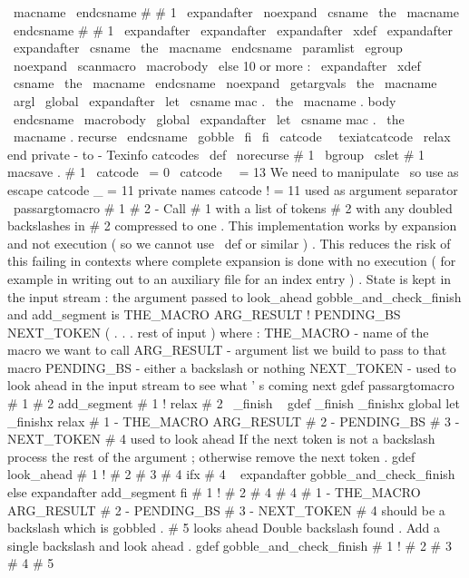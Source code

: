 {{{{\
macname
\
endcsname
#
#
1
{
%
\
expandafter
\
noexpand
\
csname
\
the
\
macname
\
endcsname
#
#
1
}
%
\
expandafter
\
expandafter
\
expandafter
\
xdef
\
expandafter
\
expandafter
\
csname
\
the
\
macname
\
endcsname
\
paramlist
{
%
\
egroup
\
noexpand
\
scanmacro
{
\
macrobody
}
}
%
\
else
%
10
or
more
:
\
expandafter
\
xdef
\
csname
\
the
\
macname
\
endcsname
{
%
\
noexpand
\
getargvals
{
\
the
\
macname
}
{
\
argl
}
%
}
%
\
global
\
expandafter
\
let
\
csname
mac
.
\
the
\
macname
.
body
\
endcsname
\
macrobody
\
global
\
expandafter
\
let
\
csname
mac
.
\
the
\
macname
.
recurse
\
endcsname
\
gobble
\
fi
\
fi
}
\
catcode
\
\
texiatcatcode
\
relax
%
end
private
-
to
-
Texinfo
catcodes
\
def
\
norecurse
#
1
{
\
bgroup
\
cslet
{
#
1
}
{
macsave
.
#
1
}
}
%
%
%
%
%
%
%
%
%
%
%
%
%
%
%
%
%
%
%
%
%
%
%
%
%
%
%
%
%
%
%
%
%
%
%
%
%
%
%
%
%
%
%
%
%
%
%
%
{
\
catcode
\
=
0
\
catcode
\
\
=
13
%
We
need
to
manipulate
\
so
use
as
escape
catcode
_
=
11
%
private
names
catcode
!
=
11
%
used
as
argument
separator
%
\
passargtomacro
#
1
#
2
-
%
Call
#
1
with
a
list
of
tokens
#
2
with
any
doubled
backslashes
in
#
2
%
compressed
to
one
.
%
%
This
implementation
works
by
expansion
and
not
execution
(
so
we
cannot
use
%
\
def
or
similar
)
.
This
reduces
the
risk
of
this
failing
in
contexts
where
%
complete
expansion
is
done
with
no
execution
(
for
example
in
writing
out
to
%
an
auxiliary
file
for
an
index
entry
)
.
%
%
State
is
kept
in
the
input
stream
:
the
argument
passed
to
%
look_ahead
gobble_and_check_finish
and
add_segment
is
%
%
THE_MACRO
ARG_RESULT
!
{
PENDING_BS
}
NEXT_TOKEN
(
.
.
.
rest
of
input
)
%
%
where
:
%
THE_MACRO
-
name
of
the
macro
we
want
to
call
%
ARG_RESULT
-
argument
list
we
build
to
pass
to
that
macro
%
PENDING_BS
-
either
a
backslash
or
nothing
%
NEXT_TOKEN
-
used
to
look
ahead
in
the
input
stream
to
see
what
'
s
coming
next
gdef
passargtomacro
#
1
#
2
{
%
add_segment
#
1
!
{
}
relax
#
2
\
_finish
\
%
}
gdef
_finish
{
_finishx
}
global
let
_finishx
relax
%
#
1
-
THE_MACRO
ARG_RESULT
%
#
2
-
PENDING_BS
%
#
3
-
NEXT_TOKEN
%
#
4
used
to
look
ahead
%
%
If
the
next
token
is
not
a
backslash
process
the
rest
of
the
argument
;
%
otherwise
remove
the
next
token
.
gdef
look_ahead
#
1
!
#
2
#
3
#
4
{
%
ifx
#
4
\
%
expandafter
gobble_and_check_finish
else
expandafter
add_segment
fi
#
1
!
{
#
2
}
#
4
#
4
%
}
%
#
1
-
THE_MACRO
ARG_RESULT
%
#
2
-
PENDING_BS
%
#
3
-
NEXT_TOKEN
%
#
4
should
be
a
backslash
which
is
gobbled
.
%
#
5
looks
ahead
%
%
Double
backslash
found
.
Add
a
single
backslash
and
look
ahead
.
gdef
gobble_and_check_finish
#
1
!
#
2
#
3
#
4
#
5
{
}}}}}
